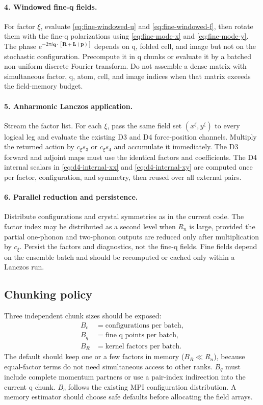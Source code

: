 \documentclass{article}
\begin{document}
\paragraph{4. Windowed fine-q fields.}
For factor $\xi$, evaluate \autoref{eq:fine-windowed-u} and
\autoref{eq:fine-windowed-f}, then rotate them with the fine-q
polarizations using \autoref{eq:fine-mode-x} and
\autoref{eq:fine-mode-y}. The phase
$e^{-2\pi i\bm q\cdot[\bm R+\bm L(\bm p)]}$ depends on q, folded cell,
and image but not on the stochastic configuration. Precompute it in q
chunks or evaluate it by a batched non-uniform discrete Fourier transform.
Do not assemble a dense matrix with simultaneous factor, q, atom, cell,
and image indices when that matrix exceeds the field-memory budget.

\paragraph{5. Anharmonic Lanczos application.}
Stream the factor list. For each $\xi$, pass the same field set
$(x^\xi,y^\xi)$ to every logical leg and evaluate the existing D3 and D4
force-position channels. Multiply the returned action by $c_\xi s_3$ or
$c_\xi s_4$ and accumulate it immediately. The D3 forward and adjoint maps
must use the identical factors and coefficients. The D4 internal scalars
in \autoref{eq:d4-internal-xx} and \autoref{eq:d4-internal-xy} are computed
once per factor, configuration, and symmetry, then reused over all external
pairs.

\paragraph{6. Parallel reduction and persistence.}
Distribute configurations and crystal symmetries as in the current code.
The factor index may be distributed as a second level when $R_n$ is large,
provided the partial one-phonon and two-phonon outputs are reduced only
after multiplication by $c_\xi$. Persist the factors and diagnostics, not
the fine-q fields. Fine fields depend on the ensemble batch and should be
recomputed or cached only within a Lanczos run.

\subsection{Chunking policy}
\label{sec:chunking}

Three independent chunk sizes should be exposed:
\begin{align}
    B_c&=\text{configurations per batch},\nonumber\\
    B_q&=\text{fine q points per batch},\nonumber\\
    B_R&=\text{kernel factors per batch}.
    \label{eq:chunk-sizes}
\end{align}
The default should keep one or a few factors in memory
($B_R\ll R_n$), because equal-factor terms do not need simultaneous access
to other ranks. $B_q$ must include complete momentum partners or use a
pair-index indirection into the current q chunk. $B_c$ follows the existing
MPI configuration distribution. A memory estimator should choose safe
defaults before allocating the field arrays.
\end{document}
